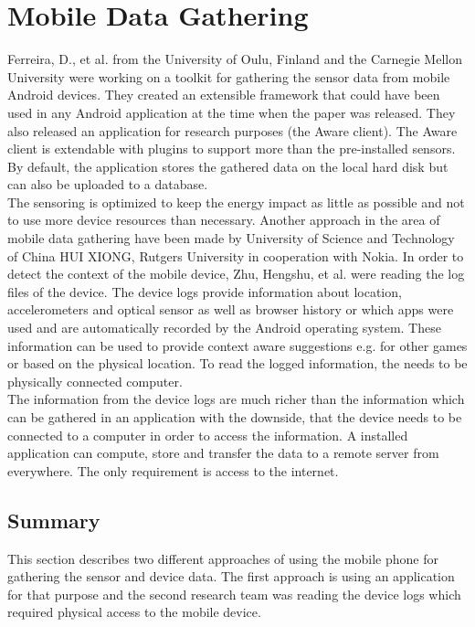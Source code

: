\section{Mobile Data Gathering}
Ferreira, D., et al. \cite{ferreira2015aware} from the University of Oulu, Finland and the Carnegie Mellon University were working on a toolkit for gathering the sensor data from mobile Android devices. They created an extensible framework that could have been used in any Android application at the time when the paper was released. They also released an application for research purposes (the Aware client). The Aware client is extendable with plugins to support more than the pre-installed sensors. By default, the application stores the gathered data on the local hard disk but can also be uploaded to a database.\\
The sensoring is optimized to keep the energy impact as little as possible and not to use more device resources than necessary.
\bigbreak
Another approach in the area of mobile data gathering have been made by University of Science and Technology of China HUI XIONG, Rutgers University in cooperation with Nokia. In order to detect the context of the mobile device, Zhu, Hengshu, et al. \cite{zhu2015mining} were reading the log files of the device. The device logs provide information about location, accelerometers and optical sensor as well as browser history or which apps were used and are automatically recorded by the Android operating system. These information can be used to provide context aware suggestions e.g. for other games or based on the physical location. To read the logged information, the needs to be physically connected computer.\\
The information from the device logs are much richer than the information which can be gathered in an application with the downside, that the device needs to be connected to a computer in order to access the information. A installed application can compute, store and transfer the data  to a remote server from everywhere. The only requirement is access to the internet.

\subsection{Summary} 
This section describes two different approaches of using the mobile phone for gathering the sensor and device data. The first approach is using an application for that purpose and the second research team was reading the device logs which required physical access to the mobile device.


